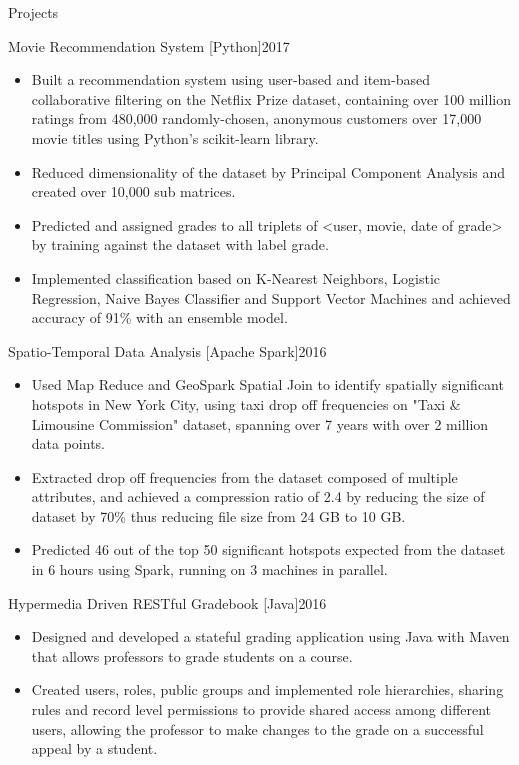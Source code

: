\documentclass[]{dhruv_misra}
\begin{document}
	
	\begin{cvsection}{Projects}
		\begin{cvsubsection}{Movie Recommendation System [Python]}{}{2017}
			\begin{itemize}
				\item Built a recommendation system using user-based and item-based collaborative filtering on the Netflix Prize dataset, containing over 100 million ratings from 480,000 randomly-chosen, anonymous customers over 17,000 movie titles using Python's scikit-learn library.
				\item Reduced dimensionality of the dataset by Principal Component Analysis and created over 10,000 sub matrices.
				\item Predicted and assigned grades to all triplets of <user, movie, date of grade> by training against the dataset with label grade.
				\item Implemented classification based on K-Nearest Neighbors, Logistic Regression, Naive Bayes Classifier and Support Vector Machines and achieved accuracy of 91\% with an ensemble model.
			\end{itemize}
		\end{cvsubsection}
		\begin{cvsubsection}{Spatio-Temporal Data Analysis [Apache Spark]}{}{2016}
			\begin{itemize}
				\item Used Map Reduce and GeoSpark Spatial Join to identify spatially significant hotspots in New York City, using taxi drop off frequencies on "Taxi \& Limousine Commission" dataset, spanning over 7 years with over 2 million data points.
   				\item Extracted drop off frequencies from the dataset composed of multiple attributes, and achieved a compression ratio of 2.4 by reducing the size of dataset by 70\% thus reducing file size from 24 GB to 10 GB.
   				\item Predicted 46 out of the top 50 significant hotspots expected from the dataset in 6 hours using Spark, running on 3 machines in parallel.
			\end{itemize}
		\end{cvsubsection}
		\begin{cvsubsection}{Hypermedia Driven RESTful Gradebook [Java]}{}{2016}
			\begin{itemize}
				\item Designed and developed a stateful grading application using Java with Maven that allows professors to grade students on a course.
				\item Created users, roles, public groups and implemented role hierarchies, sharing rules and record level permissions to provide shared access among different users, allowing the professor to make changes to the grade on a successful appeal by a student.
			\end{itemize}
		\end{cvsubsection}
	\end{cvsection}
	
\end{document}
